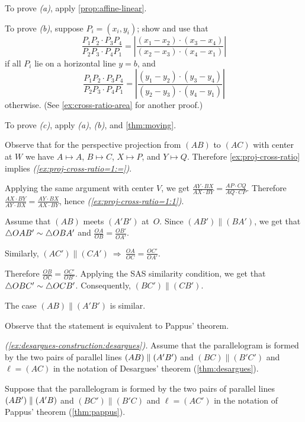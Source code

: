 To prove \textit{(a)}, apply \ref{prop:affine-linear}.

To prove \textit{(b)}, suppose $P_i=(x_i,y_i)$;
show and use that 
\[\frac{P_1P_2\cdot P_3P_4}{P_2P_3\cdot P_4P_1}
=\left|\frac{(x_1-x_2)\cdot(x_3-x_4)}{(x_2-x_3)\cdot (x_4-x_1)}\right|\]
if all $P_i$ lie on a horizontal line $y=b$, and
\[\frac{P_1P_2\cdot P_3P_4}{P_2P_3\cdot P_4P_1}
=\left|\frac{(y_1-y_2)\cdot(y_3-y_4)}{(y_2-y_3)\cdot (y_4-y_1)}\right|\]
otherwise. (See \ref{ex:cross-ratio-area} for another proof.)

To prove \textit{(c)}, apply \textit{(a)}, \textit{(b)}, and \ref{thm:moving}.

Observe that for the perspective projection from $(AB)$ to $(AC)$ with center at $W$ we have
$A\mapsto A$, $B\mapsto C$, $X\mapsto P$, and $Y\mapsto Q$.
Therefore \ref{ex:proj-cross-ratio} implies \textit{(\ref{ex:proj-cross-ratio=1:=})}.

Applying the same argument with center $V$, we get  
$\frac{AY\cdot BX}{AX\cdot BY}=\frac{AP\cdot CQ}{AQ\cdot CP}$.
Therefore 
$\frac{AX\cdot BY}{AY\cdot BX}=\frac{AY\cdot BX}{AX\cdot BY}$,
hence \textit{(\ref{ex:proj-cross-ratio=1:1})}.


Assume that $(AB)$ meets $(A'B')$ at~$O$.
Since $(AB')\parallel (BA')$, we get that $\triangle OAB'\z\sim\triangle OBA'$
and
$\frac{OA}{OB}=\frac{OB'}{OA'}$.

Similarly, $(AC')\parallel (CA')\ \Longrightarrow\ \frac{OA}{OC}=\frac{OC'}{OA'}$.

Therefore
$\frac{OB}{OC}=\frac{OC'}{OB'}$.
Applying the SAS similarity condition, we get that
$\triangle OBC'\z\sim\triangle OCB'$.
Consequently, $(BC')\parallel (CB')$.

The case $(AB)\parallel(A'B')$ is similar.

 Observe that the statement is equivalent to Pappus' theorem.

\parbf{\ref{ex:desargues-construction};} \textit{(\ref{ex:desargues-construction:desargues}).}
Assume that the parallelogram is formed by the two pairs of parallel lines $(AB)\z\parallel (A'B')$ and $(BC)\parallel(B'C')$ and $\ell=(AC)$ in the notation of Desargues' theorem (\ref{thm:desargues}).

 Suppose that the parallelogram is formed by the two pairs of parallel lines $(AB')\z\parallel (A'B)$ and $(BC')\parallel(B'C)$ and $\ell=(AC')$ in the notation of Pappus' theorem (\ref{thm:pappus}).

